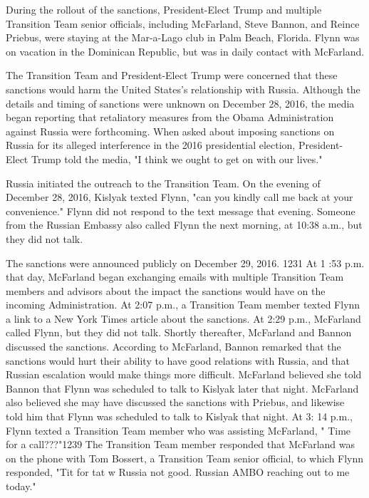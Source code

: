 During the rollout of the sanctions, President-Elect Trump and multiple Transition Team senior officials, including McFarland, Steve Bannon, and Reince Priebus, were staying at the Mar-a-Lago club in Palm Beach, Florida. Flynn was on vacation in the Dominican Republic,%
but was in daily contact with McFarland.%

The Transition Team and President-Elect Trump were concerned that these sanctions would harm the United States's relationship with Russia.%
Although the details and timing of sanctions were unknown on December 28, 2016, the media began reporting that retaliatory measures from the Obama Administration against Russia were forthcoming.%
When asked about imposing sanctions on Russia for its alleged interference in the 2016 presidential election, President-Elect Trump told the media, "I think we ought to get on with our lives."%

Russia initiated the outreach to the Transition Team. On the evening of December 28, 2016, Kislyak texted Flynn, "can you kindly call me back at your convenience."%
Flynn did not respond to the text message that evening. Someone from the Russian Embassy also called Flynn the next morning, at 10:38 a.m., but they did not talk.%

The sanctions were announced publicly on December 29, 2016. 1231 At 1 :53 p.m. that day, McFarland began exchanging emails with multiple Transition Team members and advisors about the impact the sanctions would have on the incoming Administration.%
At 2:07 p.m., a Transition Team member texted Flynn a link to a New York Times article about the sanctions.%
At 2:29 p.m., McFarland called Flynn, but they did not talk.%
Shortly thereafter, McFarland and Bannon discussed the sanctions.%
According to McFarland, Bannon remarked that the sanctions would hurt their ability to have good relations with Russia, and that Russian escalation would make things more difficult.%
McFarland believed she told Bannon that Flynn was scheduled to talk to Kislyak later that night.%
McFarland also believed she may have discussed the sanctions with Priebus, and likewise told him that Flynn was scheduled to talk to Kislyak that night.%
At 3: 14 p.m., Flynn texted a Transition Team member who was assisting McFarland, " Time for a call???"1239 The Transition Team member responded that McFarland was on the phone with Tom Bossert, a Transition Team senior official, to which Flynn responded, "Tit for tat w Russia not good. Russian AMBO reaching out to me today."%

